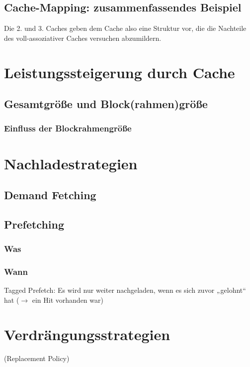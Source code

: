 \subsection{Cache-Mapping: zusammenfassendes Beispiel}

Die 2. und 3. Caches geben dem Cache also eine Struktur vor, die die Nachteile des voll-assoziativer Caches versuchen abzumildern.

\section{Leistungssteigerung durch Cache}


\subsection{Gesamtgröße und Block(rahmen)größe}
\subsubsection{Einfluss der Blockrahmengröße}

\section{Nachladestrategien}
\subsection{Demand Fetching}
\subsection{Prefetching}
\subsubsection*{Was}
\subsubsection*{Wann}
Tagged Prefetch: Es wird nur weiter nachgeladen, wenn es sich zuvor „gelohnt“ hat ($\to$ ein Hit vorhanden war)

\section{Verdrängungsstrategien}
(Replacement Policy)
